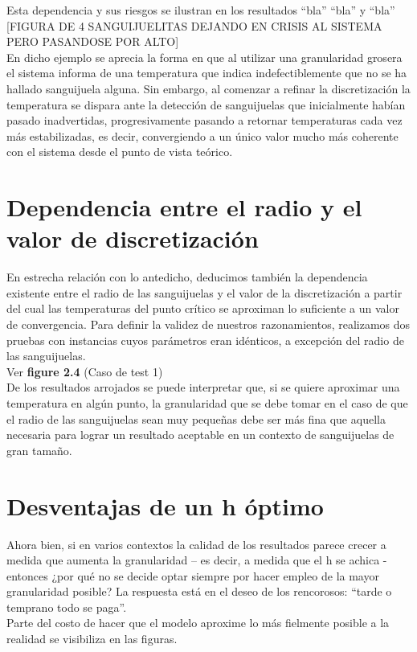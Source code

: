 \documentclass[double, 1.5in, 12pt]{beavtex}
\begin{document}
Esta dependencia y sus riesgos se ilustran en los resultados “bla” “bla” y “bla”
[FIGURA DE 4 SANGUIJUELITAS DEJANDO EN CRISIS AL SISTEMA PERO PASANDOSE POR ALTO]  \\


En dicho ejemplo se aprecia la forma en que al utilizar una granularidad grosera el sistema informa de una temperatura que indica indefectiblemente que no se ha hallado sanguijuela alguna. Sin embargo, al comenzar a refinar la discretizaci\'on la temperatura se dispara ante la detecci\'on de sanguijuelas que inicialmente hab\'ian pasado inadvertidas, progresivamente pasando a retornar temperaturas cada vez m\'as estabilizadas, es decir,  convergiendo a un \'unico valor mucho m\'as coherente con el sistema desde el punto de vista te\'orico. \\

\section{Dependencia entre el radio y el valor de discretizaci\'on}

En estrecha relaci\'on con lo antedicho, deducimos tambi\'en la dependencia existente entre el radio de las sanguijuelas y el valor de la discretizaci\'on a partir del cual las temperaturas del punto cr\'itico se aproximan lo suficiente a un valor de convergencia. Para definir la validez de nuestros razonamientos, realizamos dos pruebas con instancias cuyos par\'ametros eran id\'enticos, a excepci\'on del radio de las sanguijuelas. \\

Ver \textbf{figure 2.4} (Caso de test 1)\\

De los resultados arrojados se puede interpretar que, si se quiere aproximar una temperatura en alg\'un punto, la granularidad que se debe tomar en el caso de que el radio de las sanguijuelas sean muy pequeñas debe ser m\'as fina que aquella necesaria para lograr un resultado aceptable  en un contexto de sanguijuelas de gran tamaño.\\


\section{Desventajas de un h \'optimo}
Ahora bien, si en varios contextos la calidad de los resultados parece crecer a medida que aumenta la granularidad – es decir, a medida que el h se achica - entonces ¿por qu\'e no se decide optar siempre por hacer empleo de la mayor granularidad posible? La respuesta est\'a en el deseo de los rencorosos: “tarde o temprano todo se paga”. \\
Parte del costo de hacer que el modelo aproxime lo m\'as fielmente posible a la realidad se visibiliza en las figuras. \\
\end{document}
